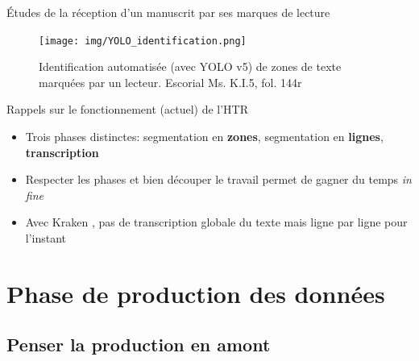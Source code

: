 \documentclass[11pt,aspectratio=169]{beamer}
\let\cite\parencite
\begin{document}
\begin{frame}{Études de la réception d'un manuscrit par ses marques de lecture}
\begin{figure}
\texttt{[image: img/YOLO\_identification.png]}
\caption{Identification automatisée  (avec YOLO v5) \cite{redmon_YouOnlyLook_2016a} de zones de texte marquées par un lecteur. Escorial Ms. K.I.5, fol. 144r}
\end{figure}
\end{frame}


\begin{frame}{Rappels sur le fonctionnement (actuel) de l'HTR}

\begin{itemize}
\item Trois phases distinctes: segmentation en \textbf{zones}, segmentation en \textbf{lignes}, \textbf{transcription}
\pause\item Respecter les phases et bien découper le travail permet de gagner du temps \textit{in fine}
\pause\item Avec Kraken \cite{kiessling_KrakenUniversalText_2019}, pas de transcription globale du texte mais ligne par ligne pour l'instant
\end{itemize}
\end{frame}

\section{Phase de production des données}

\subsection{Penser la production en amont}
\end{document}
